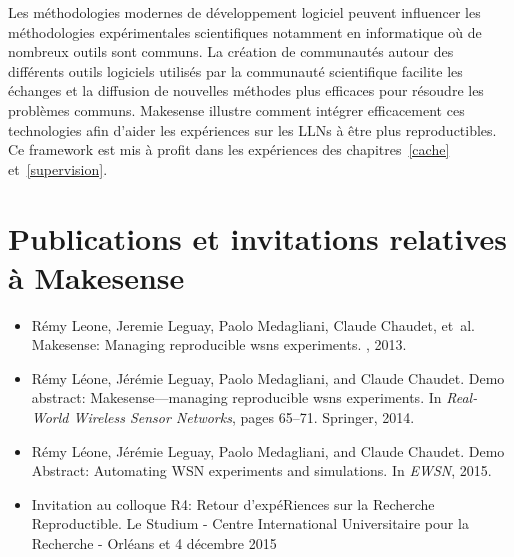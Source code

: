 Les méthodologies modernes de développement logiciel peuvent influencer les méthodologies expérimentales scientifiques notamment en informatique où de nombreux outils sont communs.
La création de communautés autour des différents outils logiciels utilisés par la communauté scientifique facilite les échanges et la diffusion de nouvelles méthodes plus efficaces pour résoudre les problèmes communs.
Makesense illustre comment intégrer efficacement ces technologies afin d'aider les expériences sur les \ac{LLN}s à être plus reproductibles.
Ce framework est mis à profit dans les expériences des chapitres~\ref{cache} et~\ref{supervision}.

\section*{Publications et invitations relatives à Makesense}

\begin{itemize}
  \item Rémy Leone, Jeremie Leguay, Paolo Medagliani, Claude Chaudet, et~al.
\newblock Makesense: Managing reproducible wsns experiments.
, 2013.

  \item Rémy Léone, Jérémie Leguay, Paolo Medagliani, and Claude
  Chaudet.
\newblock Demo abstract: Makesense—managing reproducible wsns experiments.
\newblock In {\em Real-World Wireless Sensor Networks}, pages 65--71. Springer,
  2014.

  \item Rémy Léone, Jérémie Leguay, Paolo Medagliani, and Claude
  Chaudet.
\newblock Demo Abstract: Automating WSN experiments and simulations.
\newblock In {\em EWSN}, 2015.

  \item Invitation au colloque R4: Retour d'expéRiences sur la Recherche Reproductible.
  \newblock Le Studium - Centre International Universitaire pour la Recherche - Orléans
   et 4 décembre 2015 

\end{itemize}
